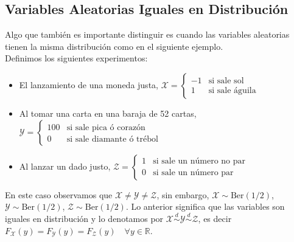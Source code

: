 \subsection{Variables Aleatorias Iguales en Distribución}
Algo que también es importante distinguir es cuando las variables aleatorias tienen la misma distribución como en el siguiente ejemplo.\\
Definimos los siguientes experimentos:
\begin{itemize}
    \item El lanzamiento de una moneda justa, $\mathcal X=\begin{cases}
        -1 & \text{si sale sol}\\
        1 & \text{si sale águila}
    \end{cases}$

    \item Al tomar una carta en una baraja de 52 cartas, $\mathcal Y=\begin{cases}
        100 & \text{si sale pica ó corazón}\\
        0 & \text{si sale diamante ó trébol}
    \end{cases}$

    \item Al lanzar un dado justo, $\mathcal Z=\begin{cases}
        1 & \text{si sale un número no par}\\
        0 & \text{si sale un número par}
    \end{cases}$
\end{itemize}
En este caso observamos que $\mathcal X \neq \mathcal Y \neq \mathcal Z$, sin embargo, $\mathcal X \sim \text{Ber}(1/2)$, $\mathcal Y \sim \text{Ber}(1/2)$, $\mathcal Z \sim \text{Ber}(1/2)$. Lo anterior significa que las variables son iguales en distribución y lo denotamos por $\mathcal X \stackrel{d}{\sim} \mathcal Y \stackrel{d}{\sim} \mathcal Z$, es decir $F_{\mathcal X}(y)=F_{\mathcal Y}(y)=F_{\mathcal Z}(y) \quad \forall y \in \mathbb{R}$.



